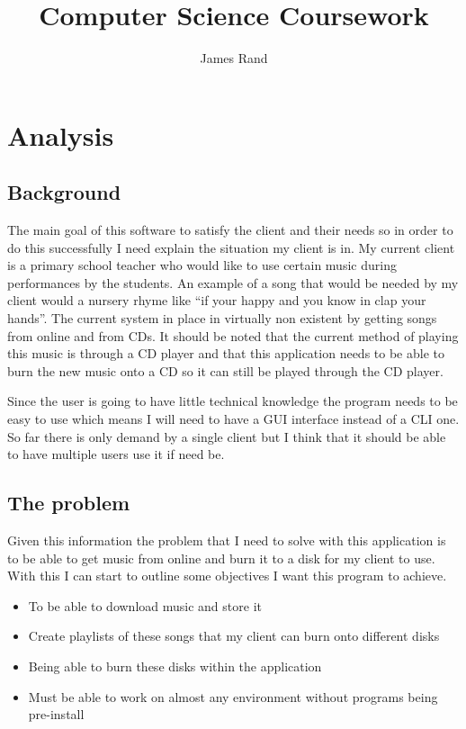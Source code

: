\documentclass{article}
\title{Computer Science Coursework}
\date{}
\author{James Rand}
\def\tightlist{}
\begin{document}
\maketitle

\tableofcontents
\setcounter{tocdepth}{5}

\newpage

\section{Analysis}\label{analysis}

\subsection{Background}\label{background}

The main goal of this software to satisfy the client and their needs so
in order to do this successfully I need explain the situation my client
is in. My current client is a primary school teacher who would like to
use certain music during performances by the students. An example of a
song that would be needed by my client would a nursery rhyme like ``if
your happy and you know in clap your hands''. The current system in
place in virtually non existent by getting songs from online
and from CDs. It should be noted that the current method of playing this music
is through a CD player and that this application needs to be able to
burn the new music onto a CD so it can still be played through the CD
player.

Since the user is going to have little technical knowledge the program
needs to be easy to use which means I will need to have a GUI interface
instead of a CLI one. So far there is only demand by a single client but
I think that it should be able to have multiple users use it if need be.


\subsection{The problem}\label{the-problem}

Given this information the problem that I need to solve with this
application is to be able to get music from online and burn it to a disk
for my client to use. With this I can start to outline some objectives I
want this program to achieve.

\begin{itemize}
        \tightlist
    \item
        To be able to download music and store it
    \item
        Create playlists of these songs that my client can burn onto different
        disks
    \item
        Being able to burn these disks within the application
    \item
        Must be able to work on almost any environment without programs being
        pre-install
\end{itemize}
\end{document}
